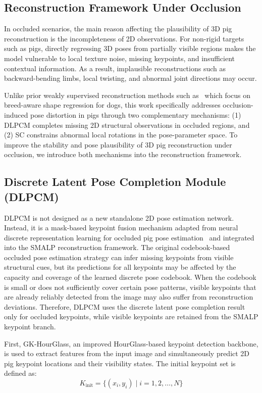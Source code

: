 \documentclass[runningheads]{llncs}
\begin{document}
\subsection{Reconstruction Framework Under Occlusion}
\label{subsec:framework}

In occluded scenarios, the main reason affecting the plausibility of 3D pig reconstruction is the incompleteness of 2D observations. For non-rigid targets such as pigs, directly regressing 3D poses from partially visible regions makes the model vulnerable to local texture noise, missing keypoints, and insufficient contextual information. As a result, implausible reconstructions such as backward-bending limbs, local twisting, and abnormal joint directions may occur.

Unlike prior weakly supervised reconstruction methods such as~\cite{ref25} which focus on breed-aware shape regression for dogs, this work specifically addresses occlusion-induced pose distortion in pigs through two complementary mechanisms: (1) DLPCM completes missing 2D structural observations in occluded regions, and (2) SC constrains abnormal local rotations in the pose-parameter space. To improve the stability and pose plausibility of 3D pig reconstruction under occlusion, we introduce both mechanisms into the reconstruction framework.

\subsection{Discrete Latent Pose Completion Module (DLPCM)}
\label{subsec:dlpcm}

DLPCM is not designed as a new standalone 2D pose estimation network. Instead, it is a mask-based keypoint fusion mechanism adapted from neural discrete representation learning for occluded pig pose estimation~\cite{ref28} and integrated into the SMALP reconstruction framework. The original codebook-based occluded pose estimation strategy can infer missing keypoints from visible structural cues, but its predictions for all keypoints may be affected by the capacity and coverage of the learned discrete pose codebook. When the codebook is small or does not sufficiently cover certain pose patterns, visible keypoints that are already reliably detected from the image may also suffer from reconstruction deviations. Therefore, DLPCM uses the discrete latent pose completion result only for occluded keypoints, while visible keypoints are retained from the SMALP keypoint branch.

First, GK-HourGlass, an improved HourGlass-based keypoint detection backbone, is used to extract features from the input image and simultaneously predict 2D pig keypoint locations and their visibility states. The initial keypoint set is defined as:
\begin{equation}
K_{\text{init}} = \{(x_i, y_i) \mid i = 1, 2, \ldots, N\}
\label{eq:keypoints}
\end{equation}
\end{document}
